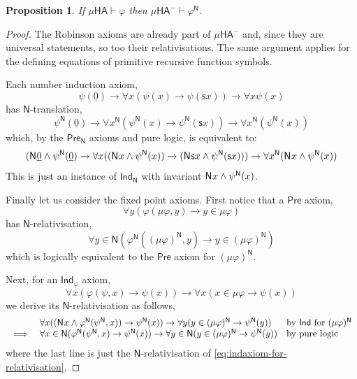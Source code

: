 \documentclass[10pt,a4paper]{amsart}
\theoremstyle{plain}
\newtheorem{proposition}[proposition]{Proposition}
\theoremstyle{definition}
\renewcommand{\phi}{\varphi}
\theoremstyle{plain}
\theoremstyle{definition} %
\renewcommand{\succ}{\mathsf s}
\newcommand{\numeral}[1]{\underline{#1}}
\renewcommand{\land}{\wedge}
\newcommand{\limp}{\to}
\newcommand{\proves}{\vdash}
\newcommand{\HA}{\mathsf{HA}}
\newcommand{\muHA}{\mu\HA}
\newcommand{\preaxiom}{\mathsf{Pre}}
\newcommand{\indaxiom}{\mathsf{Ind}}
\newcommand{\pNat}{\mathsf{N}}
\newcommand{\pnat}[1]{\pNat\hspace{.05em} #1 }
\newcommand{\nattrans}[1]{#1^{\pNat}}
\newcommand{\muHAneg}{\muHA^-}
\begin{document}
\begin{proposition}
\label{prop:muHA-to-muHAneg}
    If $\muHA \proves \phi$ then $\muHAneg \proves \nattrans \phi$.
\end{proposition}
\begin{proof}
    The Robinson axioms are already part of $\muHAneg$ and, since they are universal statements, so too their relativisations.
    The same argument applies for the defining equations of primitive recursive function symbols.
    
    Each number induction axiom,
    \begin{equation}
        \label{eq:n-ind-instance-for-relativisation}
        \psi(\numeral 0) \limp \forall x (\psi(x) \limp \psi(\succ x)) \limp \forall x \psi(x)
    \end{equation}
    has $\pNat$-translation,
    \[
    \nattrans\psi(\numeral 0)
    \limp 
    \forall x^\pNat (\nattrans\psi(x) \limp \nattrans\psi(\succ x))
    \limp 
    \forall x^\pNat (\nattrans\psi(x))
    \]
    which, by the $\preaxiom_\pNat$ axioms and pure logic, is equivalent to:
    \[
    (\pnat {\numeral 0} \land \nattrans\psi(\numeral 0)
    \limp
    \forall x ((\pnat x \land \nattrans\psi(x)) \limp (\pnat{\succ x } \land \nattrans \psi(\succ x)))
    \limp
    \forall x^\pNat (\pnat x \land \nattrans \psi(x))
    \]
    This is just an instance of $\indaxiom_\pNat$ with invariant $\pnat x \land \nattrans \psi(x)$.

    
    Finally let us consider the fixed point axioms.
    First notice that a $\preaxiom$ axiom,
    \[
    \forall y (\phi(\mu \phi,y) \limp y \in \mu \phi)
    \]
    has $\pNat$-relativisation,
    \[
    \forall y \in \pNat ( \nattrans \phi (\nattrans{(\mu\phi)},y) \limp y \in \nattrans{(\mu\phi)})
    \]
    which is logically equivalent to the $\preaxiom$ axiom for $\nattrans {(\mu\phi)}$.
    
    Next, for an $\indaxiom_\phi$ axiom,
    \begin{equation}
    \label{eq:indaxiom-for-relativisation}
        \forall x (\phi(\psi,x) \limp \psi(x)) \limp \forall x (x \in \mu\phi \limp \psi(x))
    \end{equation}
    we derive its $\pNat$-relativisation as follows,
    \[
    \begin{array}{rll}
         &\forall x ((\pnat x \land \nattrans \phi (\nattrans \psi,x) ) \limp \nattrans \psi(x)) \limp \forall y (y \in \nattrans{(\mu\phi)} \limp \nattrans \psi (y)) & \text{by $\indaxiom$ for $\nattrans{(\mu\phi)}$}   \\
         \implies & \forall x \in \pNat ( \nattrans \phi (\nattrans \psi,x)  \limp \nattrans \psi(x)) \limp \forall y \in \pNat (y \in \nattrans{(\mu\phi)} \limp \nattrans \psi (y)) & \text{by pure logic}
    \end{array}
    \]
    where the last line is just the $\pNat$-relativisation of \eqref{eq:indaxiom-for-relativisation}.
\end{proof}
\end{document}
